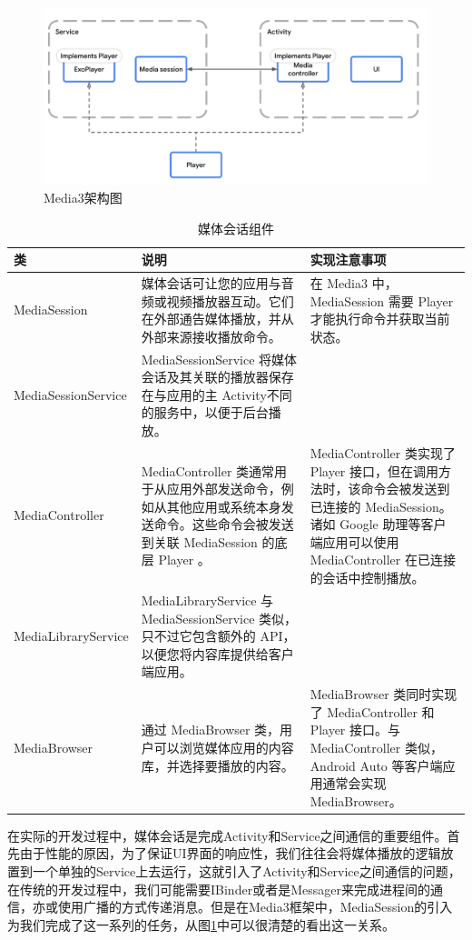 \documentclass[main.tex]{subfiles}
\begin{document}
\begin{figure}[htbp]
    \centering
    \includegraphics[width=0.9\linewidth]{assets/media3-architecture.png}
    \caption{Media3架构图}
    \label{fig:media-architecture}
\end{figure}

\begin{table}[htbp]
    \centering
    \begin{tabularx}{\textwidth}{|l|X|X|}
    \hline
    类 & 说明 & 实现注意事项 \\
    \hline
    MediaSession & 媒体会话可让您的应用与音频或视频播放器互动。它们在外部通告媒体播放，并从外部来源接收播放命令。 & 在 Media3 中，MediaSession 需要 Player 才能执行命令并获取当前状态。 \\
    \hline
    MediaSessionService & MediaSessionService 将媒体会话及其关联的播放器保存在与应用的主 Activity不同的服务中，以便于后台播放。 & \\
    \hline
    MediaController & MediaController 类通常用于从应用外部发送命令，例如从其他应用或系统本身发送命令。这些命令会被发送到关联 MediaSession 的底层 Player 。 & MediaController 类实现了 Player 接口，但在调用方法时，该命令会被发送到已连接的 MediaSession。诸如 Google 助理等客户端应用可以使用 MediaController 在已连接的会话中控制播放。 \\
    \hline
    MediaLibraryService & MediaLibraryService 与 MediaSessionService 类似，只不过它包含额外的 API，以便您将内容库提供给客户端应用。& \\
    \hline
    MediaBrowser & 通过 MediaBrowser 类，用户可以浏览媒体应用的内容库，并选择要播放的内容。 & MediaBrowser 类同时实现了 MediaController 和 Player 接口。与 MediaController 类似，Android Auto 等客户端应用通常会实现 MediaBrowser。\\
    \hline
    \end{tabularx}
    \caption{媒体会话组件}
\end{table}

在实际的开发过程中，媒体会话是完成Activity和Service之间通信的重要组件。首先由于性能的原因，为了保证UI界面的响应性，我们往往会将媒体播放的逻辑放置到一个单独的Service上去运行，这就引入了Activity和Service之间通信的问题，在传统的开发过程中，我们可能需要IBinder或者是Messager来完成进程间的通信，亦或使用广播的方式传递消息。但是在Media3框架中，MediaSession的引入为我们完成了这一系列的任务，从图\ref{fig:media-architecture}中可以很清楚的看出这一关系。
\end{document}
